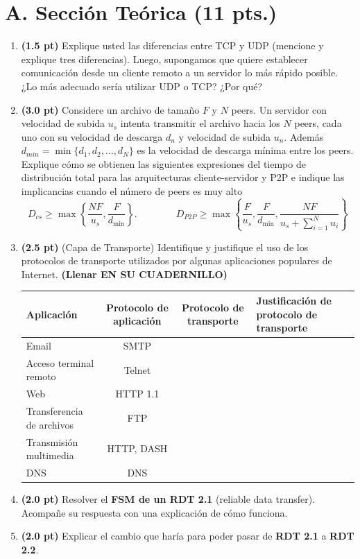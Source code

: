 \documentclass[10pt,a4paper]{article}
\newcommand{\pts}[1]{\textbf{(#1)}}
\begin{document}
\section*{A. Sección Teórica (11 pts.)}
\begin{enumerate}[label=\arabic*.]
\item \pts{1.5 pt} Explique usted las diferencias entre TCP y UDP (mencione y explique tres diferencias). Luego, supongamos que quiere establecer comunicación desde un cliente remoto a un servidor lo más rápido posible. ¿Lo más adecuado sería utilizar UDP o TCP? ¿Por qué?

\item \pts{3.0 pt} Considere un archivo de tamaño $F$ y $N$ peers. Un servidor con velocidad de subida $u_s$ intenta transmitir el archivo hacia los $N$ peers, cada uno con su velocidad de descarga $d_n$ y velocidad de subida $u_n$. Además $d_{min} = \min\{d_1, d_2, \dots, d_N\}$ es la velocidad de descarga mínima entre los peers. Explique cómo se obtienen las siguientes expresiones del tiempo de distribución total para las arquitecturas cliente-servidor y P2P e indique las implicancias cuando el número de peers es muy alto
\[
  D_{cs} \ge \max\left\{\frac{NF}{u_s}, \frac{F}{d_{\min}}\right\}.
  \qquad\qquad
  D_{P2P} \ge \max\left\{\frac{F}{u_s}, \frac{F}{d_{\min}}, \frac{NF}{u_s + \sum_{i=1}^{N} u_i}\right\}
\]

\item \pts{2.5 pt} (Capa de Transporte) Identifique y justifique el uso de los protocolos de transporte utilizados por algunas aplicaciones populares de Internet. \textbf{(Llenar EN SU CUADERNILLO)}

\smallskip
\renewcommand{\arraystretch}{1.25}
\begin{tabularx}{\linewidth}{|l|c|c|X|}
  \hline
  \textbf{Aplicación} & \textbf{Protocolo de aplicación} & \textbf{Protocolo de transporte} & \textbf{Justificación de protocolo de transporte} \\ \hline
  Email & SMTP & & \\ \hline
  Acceso terminal remoto & Telnet & & \\ \hline
  Web & HTTP 1.1 & & \\ \hline
  Transferencia de archivos & FTP & & \\ \hline
  Transmisión multimedia & HTTP, DASH & & \\ \hline
  DNS & DNS & & \\ \hline
\end{tabularx}

\item \pts{2.0 pt} Resolver el \textbf{FSM de un RDT 2.1} (reliable data transfer). Acompañe su respuesta con una explicación de cómo funciona.

\item \pts{2.0 pt} Explicar el cambio que haría para poder pasar de \textbf{RDT 2.1} a \textbf{RDT 2.2}.
\end{enumerate}
\end{document}
